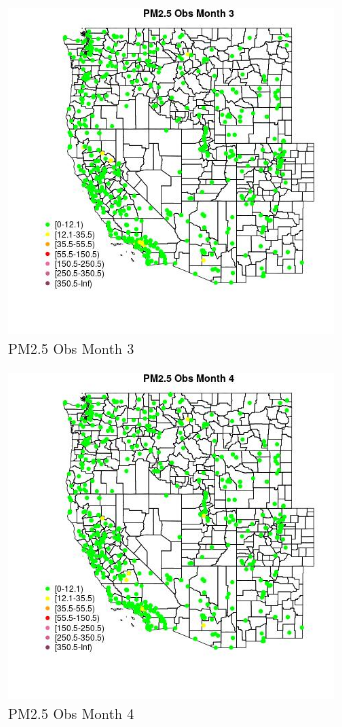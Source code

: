 \begin{figure} 
\centering  
\includegraphics[width=0.77\textwidth]{Code_Outputs/Report_ML_input_PM25_Step4_part_e_de_duplicated_aves_compiled_2019-05-14wNAs_MapObsMo3PM25_Obs.jpg} 
\caption{\label{fig:Report_ML_input_PM25_Step4_part_e_de_duplicated_aves_compiled_2019-05-14wNAsMapObsMo3PM25_Obs}PM2.5 Obs Month 3} 
\end{figure} 
 

\begin{figure} 
\centering  
\includegraphics[width=0.77\textwidth]{Code_Outputs/Report_ML_input_PM25_Step4_part_e_de_duplicated_aves_compiled_2019-05-14wNAs_MapObsMo4PM25_Obs.jpg} 
\caption{\label{fig:Report_ML_input_PM25_Step4_part_e_de_duplicated_aves_compiled_2019-05-14wNAsMapObsMo4PM25_Obs}PM2.5 Obs Month 4} 
\end{figure} 
 


